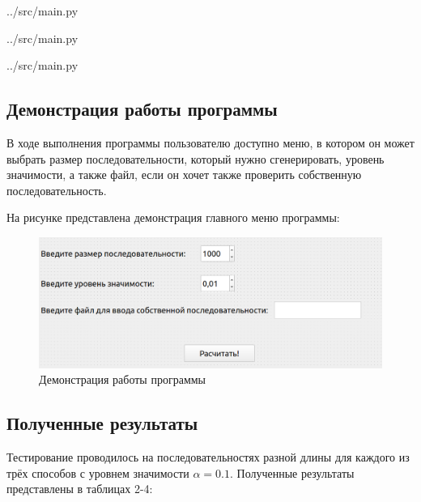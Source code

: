 \begin{lstinputlisting}[language=Python, caption=Реализация алгоритма генерации табличной последовательности, linerange={4-15}, 
	basicstyle=\footnotesize\ttfamily, frame=single,breaklines=true]{../src/main.py}
\end{lstinputlisting}
\FloatBarrier

\FloatBarrier
\begin{lstinputlisting}[language=Python, caption=Реализация алгоритма генерации алгоритмической последовательности, linerange={34-38}, 
	basicstyle=\footnotesize\ttfamily, frame=single, breaklines=true]{../src/main.py}
\end{lstinputlisting}
\FloatBarrier

\FloatBarrier
\begin{lstinputlisting}[language=Python, caption=Реализация критерия проверки последовательности на случайности, linerange={18-30}, 
	basicstyle=\footnotesize\ttfamily, frame=single, breaklines=true]{../src/main.py}
\end{lstinputlisting}
\FloatBarrier

\subsection*{Демонстрация работы программы}
В ходе выполнения программы пользователю доступно меню, в котором он может выбрать размер последовательности, который нужно сгенерировать, уровень значимости, а также файл, если он хочет также проверить собственную последовательность.

На рисунке представлена демонстрация главного меню программы:
\FloatBarrier
\begin{figure}[h]
	\begin{center}
		\includegraphics[width=\linewidth]{inc/run.png}
	\end{center}
	\caption{Демонстрация работы программы}
\end{figure}
\FloatBarrier

\subsection*{Полученные результаты}
Тестирование проводилось на последовательностях разной длины для каждого из трёх способов с уровнем значимости $\alpha = 0.1$. 
Полученные результаты представлены в таблицах 2-4: 

